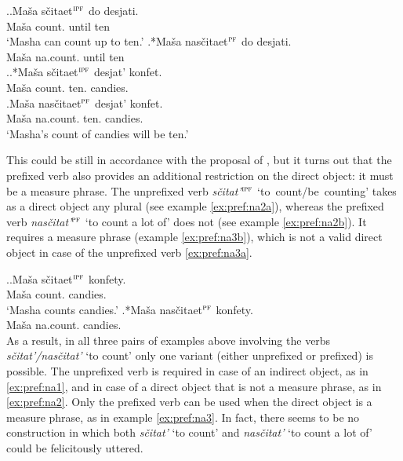 \ex.\label{ex:pref:na1}\ag.\label{ex:pref:na1a}Ma\v{s}a s\v{c}itaet$^{\textsc{ipf}}$ do desjati.\\
Ma\v{s}a count. until ten\\
\trans `Masha can count up to ten.'
\bg.*Ma\v{s}a nas\v{c}itaet$^{\textsc{pf}}$ do desjati.\label{ex:pref:na1b}\\
Ma\v{s}a na.count. until ten\\

\ex.\label{ex:pref:na2}\ag.*Ma\v{s}a s\v{c}itaet$^{\textsc{ipf}}$ desjat' konfet.\label{ex:pref:na2a}\\
Ma\v{s}a count. ten. candies.\\
\bg.\label{ex:pref:na2b}Ma\v{s}a nas\v{c}itaet$^{\textsc{pf}}$ desjat' konfet.\\
Ma\v{s}a na.count. ten. candies.\\
\trans `Masha's count of candies will be ten.'

This could be still in accordance with the proposal of \citet{Tatevosov:09}, but it turns out that the prefixed verb also provides an additional restriction on the direct object: it must be a measure phrase. The unprefixed verb \textit{s\v{c}itat'}$^{\textsc{ipf}}$ \mbox{`to count/be counting'} takes as a direct object any plural  (see example \ref{ex:pref:na2a}), whereas the prefixed verb \textit{nas\v{c}itat'}$^{\textsc{pf}}$ `to count a lot of' does not (see example \ref{ex:pref:na2b}). It requires a measure phrase (example \ref{ex:pref:na3b}), which is not a valid direct object in case of the unprefixed verb \ref{ex:pref:na3a}. 

\ex.\label{ex:pref:na3}\ag.\label{ex:pref:na3a}Ma\v{s}a s\v{c}itaet$^{\textsc{ipf}}$ konfety.\\
Ma\v{s}a count. candies.\\
\trans `Masha counts candies.'
\bg.*Ma\v{s}a nas\v{c}itaet$^{\textsc{pf}}$ konfety.\label{ex:pref:na3b}\\
Ma\v{s}a na.count. candies.\\

As a result, in all three pairs of examples above involving the verbs \textit{s\v{c}itat'/nas\v{c}itat'} `to count' only one variant (either unprefixed or prefixed) is possible. The unprefixed verb is required in case of an indirect object, as in \ref{ex:pref:na1}, and in case of a direct object that is not a measure phrase, as in \ref{ex:pref:na2}. Only the prefixed verb can be used when the direct object is a measure phrase, as in example \ref{ex:pref:na3}. In fact, there seems to be no construction in which both \textit{s\v{c}itat'} `to count' and \textit{nas\v{c}itat'} `to count a lot of' could be felicitously uttered.

